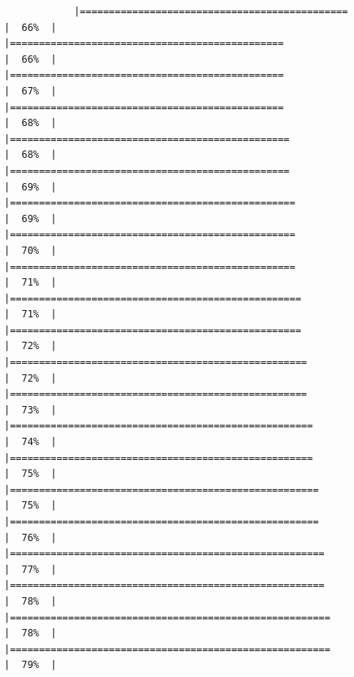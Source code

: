 \documentclass[
]{article}
\begin{document}
\begin{verbatim}
            |==============================================                        |  66%  |                                                                              |===============================================                       |  66%  |                                                                              |===============================================                       |  67%  |                                                                              |===============================================                       |  68%  |                                                                              |================================================                      |  68%  |                                                                              |================================================                      |  69%  |                                                                              |=================================================                     |  69%  |                                                                              |=================================================                     |  70%  |                                                                              |=================================================                     |  71%  |                                                                              |==================================================                    |  71%  |                                                                              |==================================================                    |  72%  |                                                                              |===================================================                   |  72%  |                                                                              |===================================================                   |  73%  |                                                                              |====================================================                  |  74%  |                                                                              |====================================================                  |  75%  |                                                                              |=====================================================                 |  75%  |                                                                              |=====================================================                 |  76%  |                                                                              |======================================================                |  77%  |                                                                              |======================================================                |  78%  |                                                                              |=======================================================               |  78%  |                                                                              |=======================================================               |  79%  |                                                                   
\end{verbatim}
\end{document}
